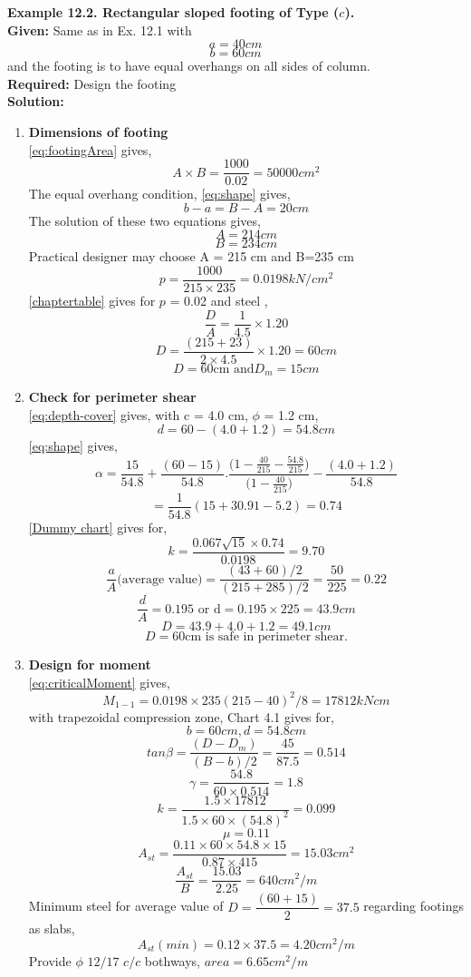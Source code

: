 \textbf{Example 12.2. Rectangular sloped footing of Type ($c$).}\\
\textbf{Given:}
Same as in Ex. 12.1 with
$$a = 40 cm$$
$$b = 60 cm$$ 
and the footing is to have equal overhangs on all sides of column.\\
\textbf{Required:} Design the footing\\
\textbf{Solution:}
\begin{enumerate}
\item   \textbf{Dimensions of footing}\\
  \equmacro \ref{eq:footingArea} gives,
  $$ A\times B= \frac{1000}{0.02}=50000 cm^2$$
  The equal overhang condition, \equmacro \ref{eq:shape} gives,
  $$ b-a=B-A=20 cm$$
  The solution of these two equations gives,
  $$A=214 cm$$
  $$B=234 cm$$
  Practical designer may choose A = 215 cm and B=235 cm
  $$p=\frac{1000}{215\times235}=0.0198  kN/cm^2$$
  \tablemacro \ref{chaptertable} gives for $p$ = 0.02 and steel \Fefouronefivemacro,
 $$\frac{D}{A}=\frac{1}{4.5}\times1.20$$
 $$D=\frac{(215+23)}{2 \times 4.5} \times 1.20=60cm$$
 $$D=60 \text{cm and} D_m=15cm$$
 
\item  \textbf{Check for perimeter shear}\\
 \equmacro \ref{eq:depth-cover} gives, with c = 4.0 cm, $\phi$ = 1.2 cm,
 $$d=60-(4.0+1.2)=54.8cm$$
 \equmacro \ref{eq:shape} gives,
 $$ \alpha=\frac{15}{54.8}+\frac{(60-15)}{54.8}.\frac{\Bigg(1-\frac{40}{215}-
\frac{54.8}{215}\Bigg)}{\Bigg(1-\frac{40}{215}\Bigg)}-\frac{(4.0+1.2)}{54.8}$$
 $$=\frac{1}{54.8}(15+30.91-5.2)=0.74$$
 \chartmacro \ref{Dummy chart} gives for,
 $$ k=\frac{0.067\sqrt{15}\times0.74}{0.0198}=9.70$$
 $$\frac{a}{A} \text{(average value)}=\frac{(43+60)/2}{(215+285)/2}=\frac{50}{225}=0.22$$
 $$\frac{d}{A}=0.195 \text{ or d}=0.195\times225=43.9 cm$$
 $$D=43.9+4.0+1.2=49.1 cm$$
 $$D=60 \text{cm is safe in perimeter shear.}$$
 
\item  \textbf{Design for moment}\\
   \equmacro \ref{eq:criticalMoment} gives,
   $$M_{1-1}=0.0198 \times 235(215-40)^2/8=17812 kN cm$$
   with trapezoidal compression zone, Chart 4.1 gives for,
   $$b=60cm, d=54.8 cm$$
   $$tan\beta =\frac{(D-D_m)}{(B-b)/2}=\frac{45}{87.5}=0.514$$
   $$\gamma=\frac{54.8}{60\times0.514}=1.8$$
   $$k=\frac{1.5 \times 17812}{1.5 \times 60 \times (54.8)^2}=0.099$$
   $$\mu=0.11$$
   $$A_{st}=\frac{0.11 \times 60 \times 54.8 \times 15}{0.87 \times 415}=15.03cm^2$$
   $$\frac{A_{st}}{B}=\frac{15.03}{2.25}=640 cm^2/m$$
  Minimum steel for average value of $D =\dfrac{(60+15)}{2}=37.5$ 
  regarding footings as slabs,
  $$A_{st}(min)=0.12\times 37.5=4.20 cm^2/m$$
  Provide $\phi$ $12/17$ $c/c$ bothways, $area=6.65 cm^2/m$
  

\end{enumerate}
